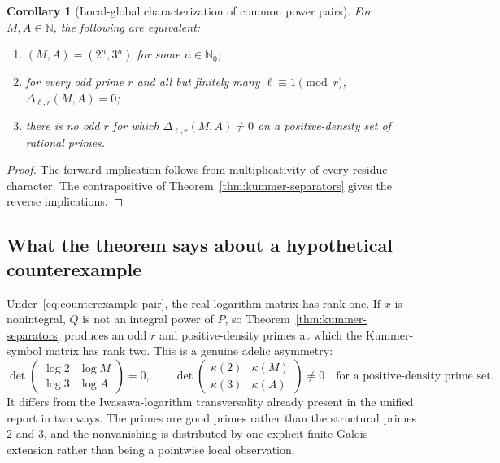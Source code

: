 \documentclass[11pt,oneside]{article}
\newtheorem{corollary}[theorem]{Corollary}
\theoremstyle{definition}
\theoremstyle{remark}
\newcommand{\N}{\mathbb N}
\newcommand{\Nzero}{\mathbb N_0}
\begin{document}
\begin{corollary}[Local-global characterization of common power pairs]
\label{cor:local-global-power}
For $M,A\in\N$, the following are equivalent:
\begin{enumerate}
\item $(M,A)=(2^n,3^n)$ for some $n\in\Nzero$;
\item for every odd prime $r$ and all but finitely many $\ell\equiv1\pmod r$,
      $\Delta_{\ell,r}(M,A)=0$;
\item there is no odd $r$ for which $\Delta_{\ell,r}(M,A)\ne0$ on a positive-density set of
      rational primes.
\end{enumerate}
\end{corollary}

\begin{proof}
The forward implication follows from multiplicativity of every residue character.  The
contrapositive of Theorem~\ref{thm:kummer-separators} gives the reverse implications.
\end{proof}

\subsection{What the theorem says about a hypothetical counterexample}

Under~\eqref{eq:counterexample-pair}, the real logarithm matrix has rank one.  If $x$ is
nonintegral, $Q$ is not an integral power of $P$, so Theorem~\ref{thm:kummer-separators}
produces an odd $r$ and positive-density primes at which the Kummer-symbol matrix has rank
two.  This is a genuine adelic asymmetry:
\begin{equation}
 \det\begin{pmatrix}\log2&\log M\\\log3&\log A\end{pmatrix}=0,
 \qquad
 \det\begin{pmatrix}\kappa(2)&\kappa(M)\\\kappa(3)&\kappa(A)\end{pmatrix}\ne0
 \quad\text{for a positive-density prime set}.
 \label{eq:real-kummer-asymmetry}
\end{equation}
It differs from the Iwasawa-logarithm transversality already present in the unified report in
two ways.  The primes are good primes rather than the structural primes $2$ and $3$, and the
nonvanishing is distributed by one explicit finite Galois extension rather than being a
pointwise local observation.
\end{document}
